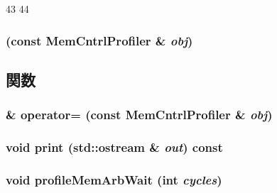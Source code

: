 \begin{DoxyCode}
43 {
44 }
\end{DoxyCode}
\hypertarget{classMemCntrlProfiler_a4d56d6af93aa1efbd1b1b14344a11f5d}{
\subsubsection[{MemCntrlProfiler}]{ (const {\bf MemCntrlProfiler} \& {\em obj})}}
\label{classMemCntrlProfiler_a4d56d6af93aa1efbd1b1b14344a11f5d}


\subsection{関数}
\hypertarget{classMemCntrlProfiler_ae886286a55686443c6634d631bd3c8eb}{
\subsubsection[{operator=}]{\& operator= (const {\bf MemCntrlProfiler} \& {\em obj})}}
\label{classMemCntrlProfiler_ae886286a55686443c6634d631bd3c8eb}
\hypertarget{classMemCntrlProfiler_ac55fe386a101fbae38c716067c9966a0}{
\subsubsection[{print}]{\setlength{\rightskip}{0pt plus 5cm}void print (std::ostream \& {\em out}) const}}
\label{classMemCntrlProfiler_ac55fe386a101fbae38c716067c9966a0}
\hypertarget{classMemCntrlProfiler_ac4e5c37195851ad5b8c630f04595034b}{
\subsubsection[{profileMemArbWait}]{\setlength{\rightskip}{0pt plus 5cm}void profileMemArbWait (int {\em cycles})}}
\label{classMemCntrlProfiler_ac4e5c37195851ad5b8c630f04595034b}



